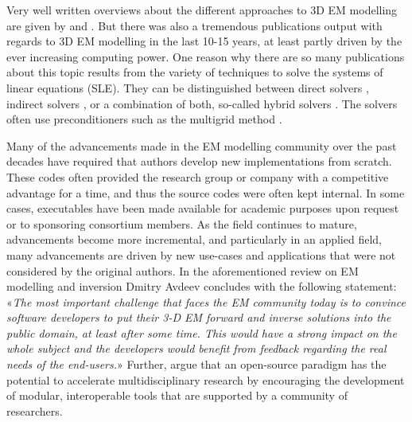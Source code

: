 \documentclass[
    paper,
  ]{geophysics}
\begin{document}
Very well written overviews about the different approaches to 3D EM modelling are given by \cite{SG.05.Avdeev} and \cite{SG.10.Borner}. But there was also a tremendous publications output with regards to 3D EM modelling in the last 10-15 years, at least partly driven by the ever increasing computing power. One reason why there are so many publications about this topic results from the variety of techniques to solve the systems of linear equations (SLE). They can be distinguished between direct solvers \citep{GEO.09.Streich, GP.14.Chung, GEO.14.Jaysaval, GEO.15.Grayver, SEG.15.Oh, GJI.18.Wang}, indirect solvers \citep{GP.06.Mulder, GJI.15.Jaysaval}, or a combination of both, so-called hybrid solvers \citep{GEO.18.Liu}. The solvers often use preconditioners such as the multigrid method \citep{SIAM.02.Aruliah, GJI.16.Jaysaval}.


Many of the advancements made in the EM modelling community over the past decades have required that authors develop new implementations from scratch. These codes often provided the research group or company with a competitive advantage for a time, and thus the source codes were often kept internal. In some cases, executables have been made available for academic purposes upon request or to sponsoring consortium members. As the field continues to mature, advancements become more incremental, and particularly in an applied field, many advancements are driven by new use-cases and applications that were not considered by the original authors. In the aforementioned review on EM modelling and inversion Dmitry Avdeev concludes with the following statement: «\emph{The most important challenge that faces the EM community today is to convince software developers to put their 3-D EM forward and inverse solutions into the public domain, at least after some time. This would have a strong impact on the whole subject and the developers would benefit from feedback regarding the real needs of the end-users.}» Further, \cite{EXG.19.Oldenburg} argue that an open-source paradigm has the potential to accelerate multidisciplinary research by encouraging the development of modular, interoperable tools that are supported by a community of researchers.
\end{document}
